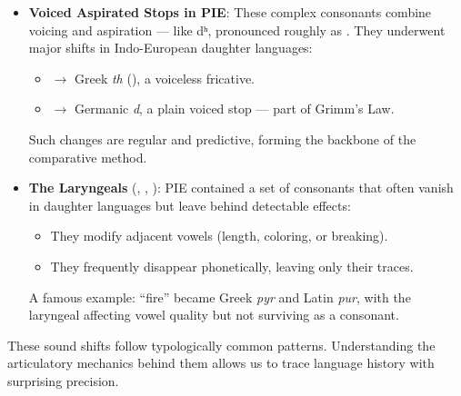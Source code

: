 \begin{tcolorbox}
\begin{itemize}[leftmargin=*]
\item \textbf{Voiced Aspirated Stops in PIE}: These complex consonants combine voicing and aspiration — like {\piefont *dʰ}, pronounced roughly as {\ipafont [dʱ]}. They underwent major shifts in Indo-European daughter languages:
  \begin{itemize}
    \item {} $\rightarrow$ Greek \emph{th} ({\ipafont [θ]}), a voiceless fricative.
    \item {} $\rightarrow$ Germanic \emph{d}, a plain voiced stop — part of Grimm’s Law.
  \end{itemize}
Such changes are regular and predictive, forming the backbone of the comparative method.

\item \textbf{The Laryngeals} (, , ): PIE contained a set of consonants that often vanish in daughter languages but leave behind detectable effects:
  \begin{itemize}
    \item They modify adjacent vowels (length, coloring, or breaking).
    \item They frequently disappear phonetically, leaving only their traces.
  \end{itemize}
A famous example:  “fire” became Greek \emph{pyr} and Latin \emph{pur}, with the laryngeal affecting vowel quality but not surviving as a consonant.

\end{itemize}

\medskip

These sound shifts follow typologically common patterns. Understanding the articulatory mechanics behind them allows us to trace language history with surprising precision.
\end{tcolorbox}

